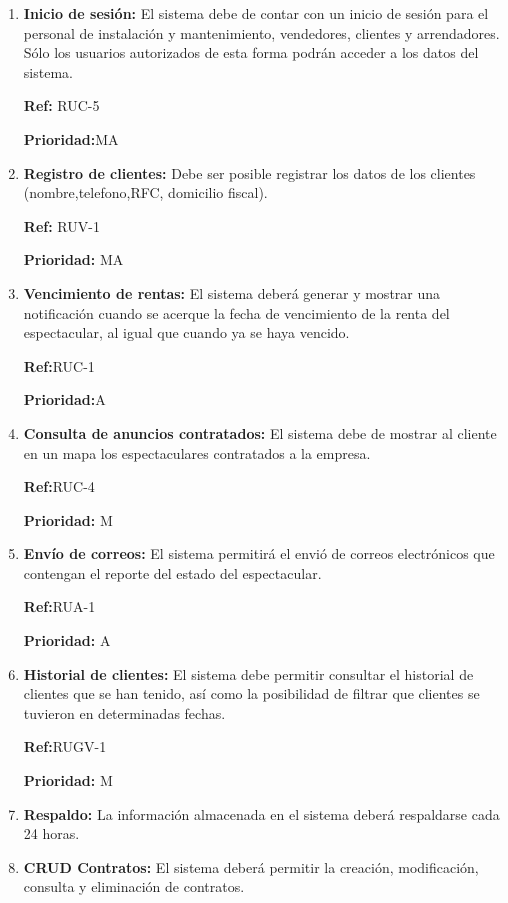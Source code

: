 \begin{enumerate}[leftmargin=2.5cm ,label={\bfseries RF-\arabic*}]
  
   \item \textbf{ Inicio de sesión:} El sistema debe de contar con un inicio de sesión para el personal de instalación y mantenimiento, vendedores, clientes y arrendadores. Sólo los usuarios autorizados de esta forma podrán acceder a los datos del sistema.
   
      \textbf{Ref:} RUC-5
    
    \textbf{Prioridad:}MA
\item \textbf{ Registro de clientes:} Debe ser posible registrar los datos de los clientes (nombre,telefono,RFC, domicilio fiscal).

   \textbf{Ref:} RUV-1
    
    \textbf{Prioridad:} MA
\item \textbf{ Vencimiento de rentas:} El sistema deberá generar y mostrar  una notificación cuando se acerque la fecha de vencimiento de la renta del espectacular, al igual que cuando ya se haya vencido.

   \textbf{Ref:}RUC-1
    
    \textbf{Prioridad:}A
\item \textbf{ Consulta de anuncios contratados:} El sistema debe de mostrar al cliente en un mapa los espectaculares contratados a la empresa.

   \textbf{Ref:}RUC-4
    
    \textbf{Prioridad:} M
    
\item \textbf{ Envío de correos:} El sistema permitirá el envió de correos electrónicos que contengan el reporte  del estado del espectacular.

 \textbf{Ref:}RUA-1
    
    \textbf{Prioridad:} A
\item \textbf{ Historial de clientes:} El sistema debe permitir consultar el historial de clientes que se han tenido, así como la posibilidad de filtrar que clientes se tuvieron en determinadas fechas.

 \textbf{Ref:}RUGV-1
 
\textbf{Prioridad:} M

\item \textbf{ Respaldo:} La información almacenada en el sistema deberá respaldarse cada 24 horas.
\item \textbf{CRUD Contratos:} El sistema deberá permitir la creación, modificación, consulta y eliminación de contratos. 


\end{enumerate}
